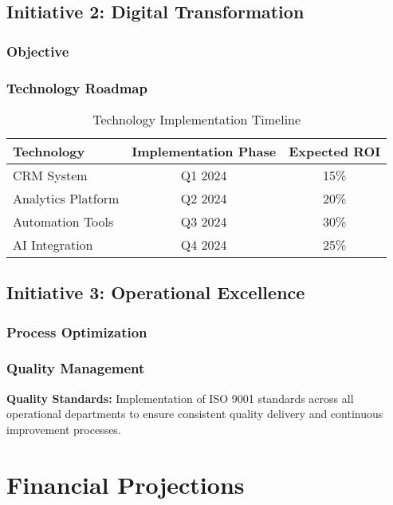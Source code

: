 \documentclass[11pt,a4paper]{article}
\begin{document}
\subsection{Initiative 2: Digital Transformation}

\subsubsection{Objective}
\lipsum[24][1-3]

\subsubsection{Technology Roadmap}
\begin{table}[h]
\centering
\begin{tabular}{@{}lcc@{}}
\toprule
\textbf{Technology} & \textbf{Implementation Phase} & \textbf{Expected ROI} \\
\midrule
CRM System & Q1 2024 & 15\% \\
Analytics Platform & Q2 2024 & 20\% \\
Automation Tools & Q3 2024 & 30\% \\
AI Integration & Q4 2024 & 25\% \\
\bottomrule
\end{tabular}
\caption{Technology Implementation Timeline}
\end{table}

\subsection{Initiative 3: Operational Excellence}

\subsubsection{Process Optimization}
\lipsum[25-26]

\subsubsection{Quality Management}
\begin{highlight}
\textbf{Quality Standards:} Implementation of ISO 9001 standards across all operational departments to ensure consistent quality delivery and continuous improvement processes.
\end{highlight}

\lipsum[27]

\section{Financial Projections}
\end{document}

